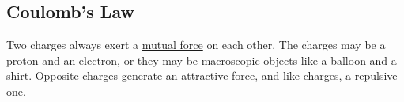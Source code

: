 \documentclass[main.tex]{subfiles}
\begin{document}




\cyanhrule

\subsection{Coulomb's Law} \label{fKC05f}

Two charges always exert a \href{https://phet.colorado.edu/en/simulations/coulombs-law}{mutual force} on each other. The charges may be a proton and an electron, or they may be macroscopic objects like a balloon and a shirt. Opposite charges generate an attractive force, and like charges, a repulsive one. 


\def\distanceA{5}
\def\distanceR{2}
\end{document}
